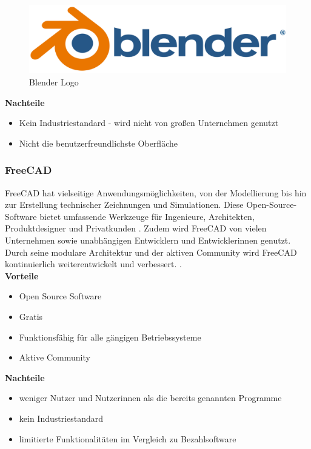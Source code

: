 \begin{figure}[H]
	\centering
	\includegraphics[width=0.3\linewidth]{images/Logo_Blender.png}
	\caption[Blender Logo]{Blender Logo}
	\label{fig:Blender}
\end{figure}


\textbf{Nachteile}
\begin{itemize}
	\item Kein Industriestandard - wird nicht von großen Unternehmen genutzt
	\item Nicht die benutzerfreundlichste Oberfläche \parencite{BlenderProsUndCons}
\end{itemize}



\subsubsection{FreeCAD}
FreeCAD hat vielseitige Anwendungsmöglichkeiten, von der Modellierung bis hin zur Erstellung technischer Zeichnungen und Simulationen. Diese Open-Source-Software bietet umfassende Werkzeuge für Ingenieure, Architekten, Produktdesigner und Privatkunden \parencite{FreeCAD}. Zudem wird FreeCAD von vielen Unternehmen sowie unabhängigen Entwicklern und Entwicklerinnen genutzt. Durch seine modulare Architektur und der aktiven Community wird FreeCAD kontinuierlich weiterentwickelt und verbessert.   \parencite{FreeCAD2}. \\

\newpage
\textbf{Vorteile}
\begin{itemize}
	\item Open Source Software
	\item Gratis
	\item Funktionsfähig für alle gängigen Betriebssysteme
	\item Aktive Community \parencite{FreeCADReviews}
\end{itemize}

\textbf{Nachteile}
\begin{itemize}
	\item weniger Nutzer und Nutzerinnen als die bereits genannten Programme
	\item kein Industriestandard
	\item limitierte Funktionalitäten im Vergleich zu Bezahlsoftware \parencite{FreeCADReviews}
\end{itemize}

